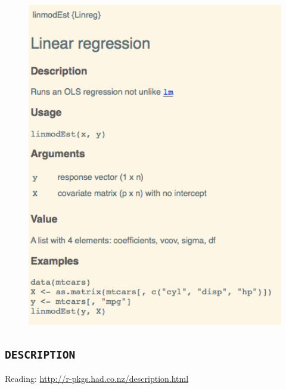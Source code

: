 \documentclass[]{book}
\theoremstyle{definition}
\theoremstyle{definition}
\theoremstyle{definition}
\theoremstyle{remark}
\begin{document}
\begin{figure}

{\centering \includegraphics[width=5.43in]{images/ch3_formatted_help} 

}

\end{figure}

\subsection{\texorpdfstring{\texttt{DESCRIPTION}}{DESCRIPTION}}\label{description}

Reading: \url{http://r-pkgs.had.co.nz/description.html}
\end{document}
